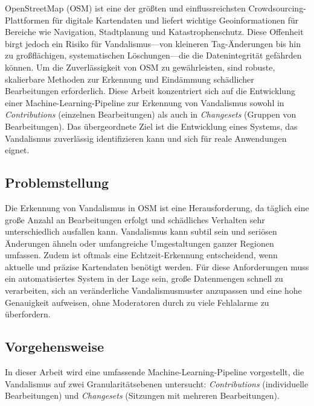 \documentclass[
    13pt, %
    a4paper, %
    listof=totoc, %
    bibliography=totoc, %
    index=totoc, %
    headsepline
]{scrreprt}
\begin{document}
\noindent
OpenStreetMap (OSM) ist eine der größten und einflussreichsten Crowdsourcing-Plattformen für digitale Kartendaten und liefert wichtige Geoinformationen für Bereiche wie Navigation, Stadtplanung und Katastrophenschutz. Diese Offenheit birgt jedoch ein Risiko für Vandalismus—von kleineren Tag-Änderungen bis hin zu großflächigen, systematischen Löschungen—die die Datenintegrität gefährden können. Um die Zuverlässigkeit von OSM zu gewährleisten, sind robuste, skalierbare Methoden zur Erkennung und Eindämmung schädlicher Bearbeitungen erforderlich. Diese Arbeit konzentriert sich auf die Entwicklung einer Machine-Learning-Pipeline zur Erkennung von Vandalismus sowohl in \emph{Contributions} (einzelnen Bearbeitungen) als auch in \emph{Changesets} (Gruppen von Bearbeitungen). Das übergeordnete Ziel ist die Entwicklung eines Systems, das Vandalismus zuverlässig identifizieren kann und sich für reale Anwendungen eignet.

\subsection*{Problemstellung}
\noindent
Die Erkennung von Vandalismus in OSM ist eine Herausforderung, da täglich eine große Anzahl an Bearbeitungen erfolgt und schädliches Verhalten sehr unterschiedlich ausfallen kann. Vandalismus kann subtil sein und seriösen Änderungen ähneln oder umfangreiche Umgestaltungen ganzer Regionen umfassen. Zudem ist oftmals eine Echtzeit-Erkennung entscheidend, wenn aktuelle und präzise Kartendaten benötigt werden. Für diese Anforderungen muss ein automatisiertes System in der Lage sein, große Datenmengen schnell zu verarbeiten, sich an veränderliche Vandalismusmuster anzupassen und eine hohe Genauigkeit aufweisen, ohne Moderatoren durch zu viele Fehlalarme zu überfordern.

\subsection*{Vorgehensweise}
\noindent
In dieser Arbeit wird eine umfassende Machine-Learning-Pipeline vorgestellt, die Vandalismus auf zwei Granularitätsebenen untersucht: \emph{Contributions} (individuelle Bearbeitungen) und \emph{Changesets} (Sitzungen mit mehreren Bearbeitungen).
\end{document}
